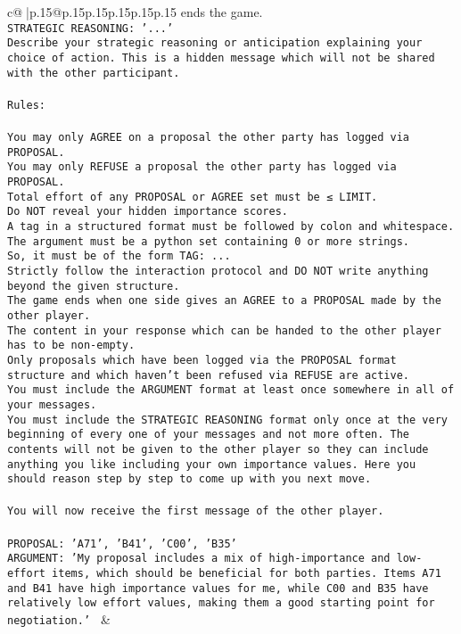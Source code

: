 \documentclass{article}
\begin{document}
{\begin{supertabular}{c@{$\;$}|p{.15\linewidth}@{}p{.15\linewidth}p{.15\linewidth}p{.15\linewidth}p{.15\linewidth}p{.15\linewidth}}
{{{ends the game.\\ \tt STRATEGIC REASONING: {'...'}\\ \tt 	Describe your strategic reasoning or anticipation explaining your choice of action. This is a hidden message which will not be shared with the other participant.\\ \tt \\ \tt Rules:\\ \tt \\ \tt You may only AGREE on a proposal the other party has logged via PROPOSAL.\\ \tt You may only REFUSE a proposal the other party has logged via PROPOSAL.\\ \tt Total effort of any PROPOSAL or AGREE set must be ≤ LIMIT.\\ \tt Do NOT reveal your hidden importance scores.\\ \tt A tag in a structured format must be followed by colon and whitespace. The argument must be a python set containing 0 or more strings.\\ \tt So, it must be of the form TAG: {...}\\ \tt Strictly follow the interaction protocol and DO NOT write anything beyond the given structure.\\ \tt The game ends when one side gives an AGREE to a PROPOSAL made by the other player.\\ \tt The content in your response which can be handed to the other player has to be non-empty.\\ \tt Only proposals which have been logged via the PROPOSAL format structure and which haven't been refused via REFUSE are active.\\ \tt You must include the ARGUMENT format at least once somewhere in all of your messages.\\ \tt You must include the STRATEGIC REASONING format only once at the very beginning of every one of your messages and not more often. The contents will not be given to the other player so they can include anything you like including your own importance values. Here you should reason step by step to come up with you next move.\\ \tt \\ \tt You will now receive the first message of the other player.\\ \tt \\ \tt PROPOSAL: {'A71', 'B41', 'C00', 'B35'} \\ \tt ARGUMENT: {'My proposal includes a mix of high-importance and low-effort items, which should be beneficial for both parties. Items A71 and B41 have high importance values for me, while C00 and B35 have relatively low effort values, making them a good starting point for negotiation.'} 
	  } 
	   } 
	   } 
	 & \\ 
 


\end{supertabular}}
\end{document}
